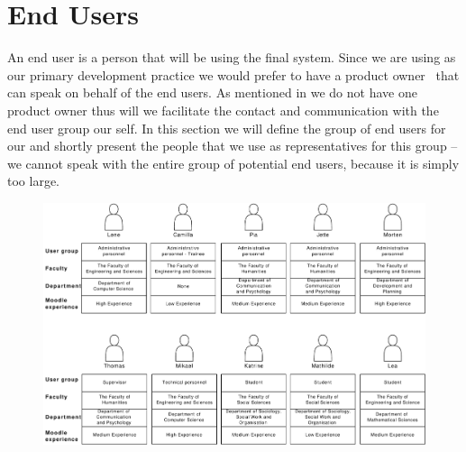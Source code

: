 \section{End Users}
\label{sec:enduser}
An end user is a person that will be using the final system.
Since we are using \scrum{} as our primary development practice we would prefer to have a product owner~\cite[p.~115]{Larman04} that can speak on behalf of the end users.
As mentioned in  we do not have one product owner thus will we facilitate the contact and communication with the end user group our self.
In this section we will define the group of end users for our \subsystem{} and shortly present the people that we use as representatives for this group -- we cannot speak with the entire group of potential end users, because it is simply too large.


\begin{figure}%
\includegraphics[width=\textwidth]{images/UserGroups}%
\caption{}%
\label{fig:usergroup}%
\end{figure}

